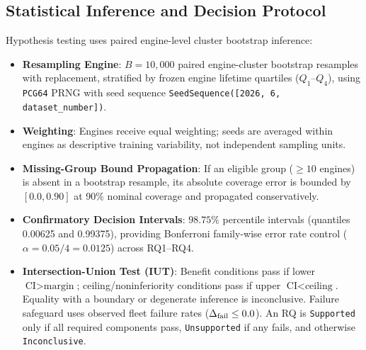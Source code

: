 \subsection{Statistical Inference and Decision Protocol}
Hypothesis testing uses paired engine-level cluster bootstrap inference:
\begin{itemize}
    \item \textbf{Resampling Engine}: $B = 10{,}000$ paired engine-cluster bootstrap resamples with replacement, stratified by frozen engine lifetime quartiles ($Q_1$--$Q_4$), using \texttt{PCG64} PRNG with seed sequence \texttt{SeedSequence([2026, 6, dataset\_number])}.
    \item \textbf{Weighting}: Engines receive equal weighting; seeds are averaged within engines as descriptive training variability, not independent sampling units.
    \item \textbf{Missing-Group Bound Propagation}: If an eligible group ($\ge 10$ engines) is absent in a bootstrap resample, its absolute coverage error is bounded by $[0.0, 0.90]$ at 90\% nominal coverage and propagated conservatively.
    \item \textbf{Confirmatory Decision Intervals}: $98.75\%$ percentile intervals (quantiles 0.00625 and 0.99375), providing Bonferroni family-wise error rate control ($\alpha = 0.05/4 = 0.0125$) across RQ1--RQ4.
    \item \textbf{Intersection-Union Test (IUT)}: Benefit conditions pass if lower $\text{CI} > \text{margin}$; ceiling/noninferiority conditions pass if upper $\text{CI} < \text{ceiling}$. Equality with a boundary or degenerate inference is inconclusive. Failure safeguard uses observed fleet failure rates ($\Delta_{\text{fail}} \le 0.0$). An RQ is \texttt{Supported} only if all required components pass, \texttt{Unsupported} if any fails, and otherwise \texttt{Inconclusive}.
\end{itemize}
